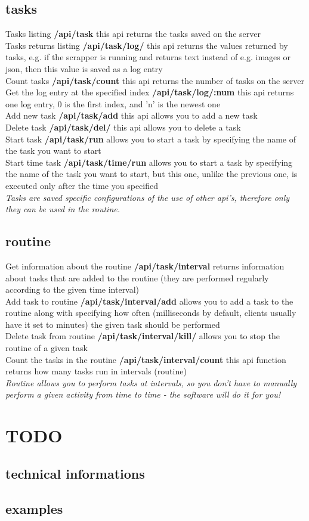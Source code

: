 \documentclass{article}
\begin{document}
\subsection{tasks}
Tasks listing \textbf{/api/task} this api returns the tasks saved on the server\\
Tasks returns listing \textbf{/api/task/log/} this api returns the values returned by tasks, e.g. if the scrapper is running and returns text instead of e.g. images or json, then this value is saved as a log entry\\
Count tasks \textbf{/api/task/count} this api returns the number of tasks on the server\\
Get the log entry at the specified index \textbf{/api/task/log/:num} this api returns one log entry, 0 is the first index, and 'n' is the newest one\\
Add new task \textbf{/api/task/add} this api allows you to add a new task\\
Delete task \textbf{/api/task/del/} this api allows you to delete a task\\
Start task \textbf{/api/task/run} allows you to start a task by specifying the name of the task you want to start\\
Start time task \textbf{/api/task/time/run} allows you to start a task by specifying the name of the task you want to start, but this one, unlike the previous one, is executed only after the time you specified\\
\textit{Tasks are saved specific configurations of the use of other api's, therefore only they can be used in the routine.}
\subsection{routine}
Get information about the routine \textbf{/api/task/interval} returns information about tasks that are added to the routine (they are performed regularly according to the given time interval)\\
Add task to routine \textbf{/api/task/interval/add} allows you to add a task to the routine along with specifying how often (milliseconds by default, clients usually have it set to minutes) the given task should be performed\\
Delete task from routine \textbf{/api/task/interval/kill/} allows you to stop the routine of a given task\\
Count the tasks in the routine \textbf{/api/task/interval/count} this api function returns how many tasks run in intervals (routine)\\
\textit{Routine allows you to perform tasks at intervals, so you don't have to manually perform a given activity from time to time - the software will do it for you!}

\section{TODO}
\subsection{technical informations}
\subsection{examples}
\end{document}
